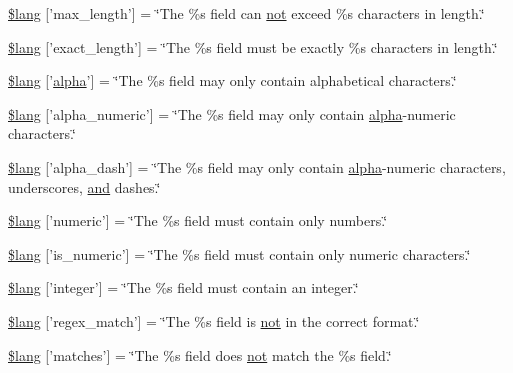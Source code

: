 \begin{DoxyCompactItemize}
\hyperlink{form__validation__lang_8php_a813327453a2d63855f7d6f84c9b58d49}{\$lang} \mbox{[}'max\-\_\-length'\mbox{]} = \char`\"{}The \%s field can \hyperlink{mathquill_8js_ac1e1ab538c27d68cc2cbafea74e7412c}{not} exceed \%s characters in length.\char`\"{}
\item 
\hyperlink{form__validation__lang_8php_af951a7ce2f4a4afd7da33e7fac480175}{\$lang} \mbox{[}'exact\-\_\-length'\mbox{]} = \char`\"{}The \%s field must be exactly \%s characters in length.\char`\"{}
\item 
\hyperlink{form__validation__lang_8php_aa49612ba8d03053d7d0b71cceb076758}{\$lang} \mbox{[}'\hyperlink{mathquill_8js_a24c6874a257d093fa6e97028a8936d62}{alpha}'\mbox{]} = \char`\"{}The \%s field may only contain alphabetical characters.\char`\"{}
\item 
\hyperlink{form__validation__lang_8php_a65ae3b2624bdea4b04ab5cf4a508f64e}{\$lang} \mbox{[}'alpha\-\_\-numeric'\mbox{]} = \char`\"{}The \%s field may only contain \hyperlink{mathquill_8js_a24c6874a257d093fa6e97028a8936d62}{alpha}-\/numeric characters.\char`\"{}
\item 
\hyperlink{form__validation__lang_8php_aee9bc9f895ccbca30d1f6433b48a509d}{\$lang} \mbox{[}'alpha\-\_\-dash'\mbox{]} = \char`\"{}The \%s field may only contain \hyperlink{mathquill_8js_a24c6874a257d093fa6e97028a8936d62}{alpha}-\/numeric characters, underscores, \hyperlink{mathquill_8js_ac39c488ee3bd6d675c340966d33495a7}{and} dashes.\char`\"{}
\item 
\hyperlink{form__validation__lang_8php_a21d76ebd4b70690a642c86afb93e3cc2}{\$lang} \mbox{[}'numeric'\mbox{]} = \char`\"{}The \%s field must contain only numbers.\char`\"{}
\item 
\hyperlink{form__validation__lang_8php_a39b379d8a1148337906321c8d2ce03ec}{\$lang} \mbox{[}'is\-\_\-numeric'\mbox{]} = \char`\"{}The \%s field must contain only numeric characters.\char`\"{}
\item 
\hyperlink{form__validation__lang_8php_a23b8cd7ec18c6e0c1f85613a06100f7e}{\$lang} \mbox{[}'integer'\mbox{]} = \char`\"{}The \%s field must contain an integer.\char`\"{}
\item 
\hyperlink{form__validation__lang_8php_aa10761f3ecf310c4b347672c3d7cc483}{\$lang} \mbox{[}'regex\-\_\-match'\mbox{]} = \char`\"{}The \%s field is \hyperlink{mathquill_8js_ac1e1ab538c27d68cc2cbafea74e7412c}{not} in the correct format.\char`\"{}
\item 
\hyperlink{form__validation__lang_8php_a5a5299bf244783be43038a191bfdee03}{\$lang} \mbox{[}'matches'\mbox{]} = \char`\"{}The \%s field does \hyperlink{mathquill_8js_ac1e1ab538c27d68cc2cbafea74e7412c}{not} match the \%s field.\char`\"{}

\end{DoxyCompactItemize}
